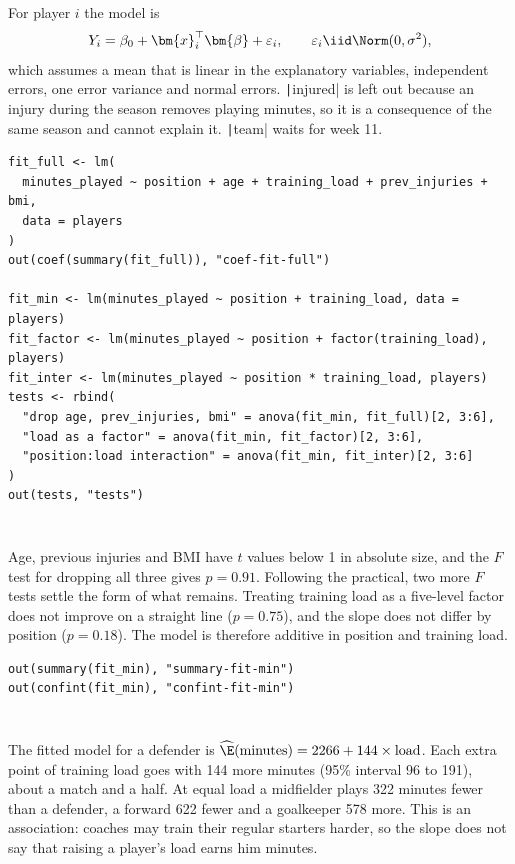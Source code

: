 \documentclass[12pt,notitlepage]{report}
\begin{document}
For player $i$ the model is
\[
  Y_i = \beta_0 + \bm{x}_i^\top \bm{\beta} + \varepsilon_i,
  \qquad \varepsilon_i \iid \Norm(0, \sigma^2),
\]
which assumes a mean that is linear in the explanatory variables,
independent errors, one error variance and normal errors.
\texttt|injured| is left out because an injury during the season
removes playing minutes, so it is a consequence of the same season and cannot
explain it. \texttt|team| waits for week 11.

\begin{verbatim}
fit_full <- lm(
  minutes_played ~ position + age + training_load + prev_injuries + bmi,
  data = players
)
out(coef(summary(fit_full)), "coef-fit-full")

fit_min <- lm(minutes_played ~ position + training_load, data = players)
fit_factor <- lm(minutes_played ~ position + factor(training_load), players)
fit_inter <- lm(minutes_played ~ position * training_load, players)
tests <- rbind(
  "drop age, prev_injuries, bmi" = anova(fit_min, fit_full)[2, 3:6],
  "load as a factor" = anova(fit_min, fit_factor)[2, 3:6],
  "position:load interaction" = anova(fit_min, fit_inter)[2, 3:6]
)
out(tests, "tests")
\end{verbatim}

\inputminted{text}{output/coef-fit-full.txt}
\inputminted{text}{output/tests.txt}

Age, previous injuries and BMI have $t$ values below 1 in absolute size, and
the $F$ test for dropping all three gives $p = 0.91$. Following the practical,
two more $F$ tests settle the form of what remains. Treating training load as
a five-level factor does not improve on a straight line ($p = 0.75$), and the
slope does not differ by position ($p = 0.18$). The model is therefore
additive in position and training load.

\begin{verbatim}
out(summary(fit_min), "summary-fit-min")
out(confint(fit_min), "confint-fit-min")
\end{verbatim}

\inputminted{text}{output/summary-fit-min.txt}
\inputminted{text}{output/confint-fit-min.txt}

The fitted model for a defender is
$\widehat{\E}(\text{minutes}) = 2266 + 144 \times \text{load}$. Each extra
point of training load goes with 144 more minutes (95\% interval 96 to 191),
about a match and a half. At equal load a midfielder plays 322 minutes fewer
than a defender, a forward 622 fewer and a goalkeeper 578 more. This is an
association: coaches may train their regular starters harder, so the slope
does not say that raising a player's load earns him minutes.
\end{document}
